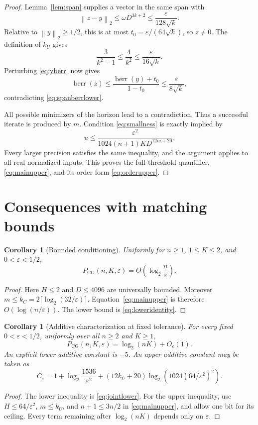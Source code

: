 \documentclass[11pt]{article}
\newtheorem{corollary}[theorem]{Corollary}
\theoremstyle{remark}\newtheorem{remark}[theorem]{Remark}
\newcommand{\norm}[1]{\left\lVert#1\right\rVert_2}
\newcommand{\PCG}{P_{\mathrm{CG}}}
\newcommand{\berr}{\operatorname{berr}}
\newcommand{\eps}{\varepsilon}
\begin{document}
\begin{proof}
Lemma~\ref{lem:span} supplies a vector in the same span with
\[
\norm{z-y}\le\omega D^{3k+2}\le\frac{\eps}{128\sqrt k}.
\]
Relative to $\norm y\ge1/2$, this is at most
$t_0=\eps/(64\sqrt k)$, so $z\ne0$.
The definition of $k_U$ gives
\[
\frac3{k^2-1}\le\frac4{k^2}\le\frac{\eps}{16\sqrt k}.
\]
Perturbing \eqref{eq:yberr} now gives
\[
\berr(z)\le\frac{\berr(y)+t_0}{1-t_0}
\le\frac{\eps}{8\sqrt k},
\]
contradicting \eqref{eq:spanberrlower}.

\medskip
All possible minimizers of the horizon lead to a contradiction. Thus a
successful iterate is produced by $m$. Condition \eqref{eq:smallness}
is exactly implied by
\[
u\le\frac{\eps^2}{1024(n+1)K D^{12m+20}}.
\]
Every larger precision satisfies the same inequality, and the argument
applies to all real normalized inputs. This proves the full threshold
quantifier, \eqref{eq:mainupper}, and its order form
\eqref{eq:orderupper}.
\end{proof}

\section{Consequences with matching bounds}
\label{sec:consequences}

\begin{corollary}[Bounded conditioning]\label{cor:K2}
Uniformly for $n\ge1$, $1\le K\le2$, and $0<\eps<1/2$,
\[
\PCG(n,K,\eps)=\Theta\!\left(\log_2\frac n\eps\right).
\]
\end{corollary}
\begin{proof}
Here $H\le2$ and $D\le4096$ are universally bounded.
Moreover $m\le k_C=2\lceil\log_2(32/\eps)\rceil$.
Equation~\eqref{eq:mainupper} is therefore
$O(\log(n/\eps))$. The lower bound is \eqref{eq:loweridentity}.
\end{proof}


\begin{corollary}[Additive characterization at fixed tolerance]\label{cor:fixedtol}
For every fixed $0<\eps<1/2$, uniformly over all $n\ge2$ and $K\ge1$,
\[
\PCG(n,K,\eps)=\log_2(nK)+O_\eps(1).
\]
An explicit lower additive constant is $-5$. An upper additive constant
may be taken as
\[
C_\eps=1+\log_2\frac{1536}{\eps^2}
+(12k_U+20)\log_2\left(1024(64/\eps^2)^2\right).
\]
\end{corollary}
\begin{proof}
The lower inequality is \eqref{eq:jointlower}. For the upper inequality,
use $H\le64/\eps^2$, $m\le k_U$, and $n+1\le3n/2$ in
\eqref{eq:mainupper}, and allow one bit for its ceiling. Every term
remaining after $\log_2(nK)$ depends only on $\eps$.
\end{proof}
\end{document}
